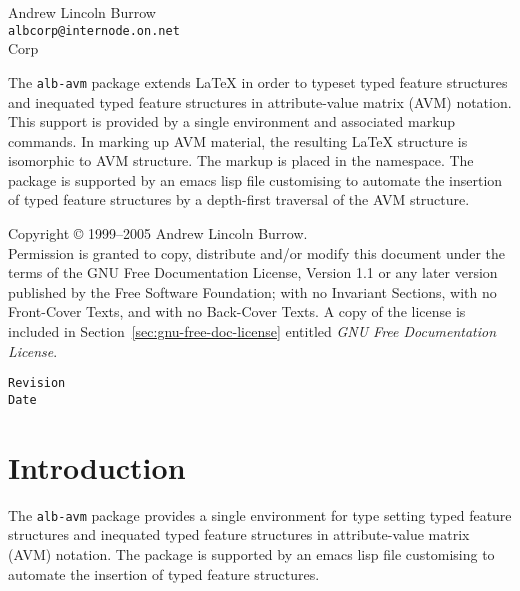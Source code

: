 \documentclass[11pt,a4paper,oneside]{alb-corp}
\begin{document}


\begin{albTitlePage}


  Andrew Lincoln Burrow\\
  \texttt{albcorp@internode.on.net}\\
  \albLogo{} Corp%



  The \texttt{alb-avm} package extends \LaTeX{} in order to typeset
  typed feature structures and inequated typed feature structures in
  attribute-value matrix (AVM) notation.  This support is provided by a
  single environment and associated markup commands.  In marking up AVM
  material, the resulting \LaTeX{} structure is isomorphic to AVM
  structure.  The markup is placed in the \albLogo{} namespace.  The
  package is supported by an emacs lisp file customising \AUCTeX{} to
  automate the insertion of typed feature structures by a depth-first
  traversal of the AVM structure.



  Copyright \copyright{} 1999--2005 Andrew Lincoln Burrow.\\
  Permission is granted to copy, distribute and/or modify this document
  under the terms of the GNU Free Documentation License, Version 1.1 or
  any later version published by the Free Software Foundation; with no
  Invariant Sections, with no Front-Cover Texts, and with no Back-Cover
  Texts.  A copy of the license is included in
  Section~\ref{sec:gnu-free-doc-license} entitled \emph{GNU Free
    Documentation License}.



  \verb$Revision$\\
  \verb$Date$

\end{albTitlePage}




\section{Introduction}
\label{sec:avm-examples:intr}

The \texttt{alb-avm} package provides a single environment for type
setting typed feature structures and inequated typed feature structures
in attribute-value matrix (AVM) notation.  The package is supported by
an emacs lisp file customising \AUCTeX{} to automate the insertion of
typed feature structures.
\end{document}
